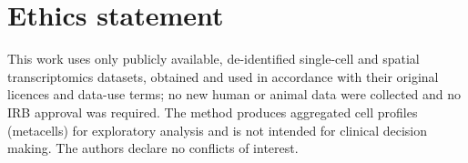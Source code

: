 \section*{Ethics statement}

This work uses only publicly available, de-identified single-cell and spatial
transcriptomics datasets, obtained and used in accordance with their original
licences and data-use terms; no new human or animal data were collected and no
IRB approval was required. The method produces aggregated cell profiles
(metacells) for exploratory analysis and is not intended for clinical decision
making. The authors declare no conflicts of interest.
